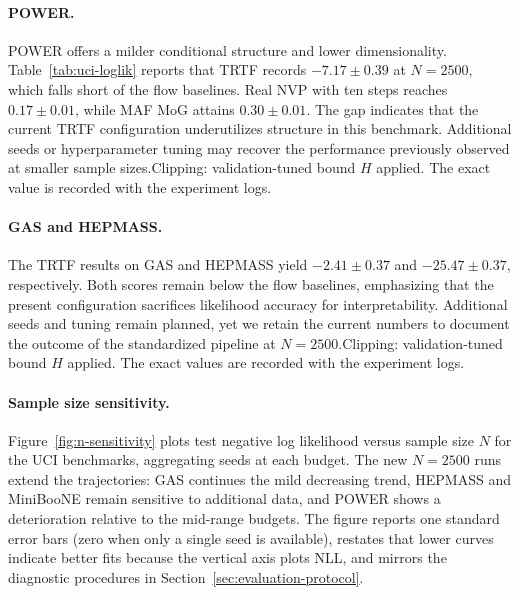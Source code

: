 \documentclass[11pt,a4paper,twoside]{book}\usepackage[]{graphicx}\usepackage[]{xcolor}
\begin{document}
\paragraph{POWER.} POWER offers a milder conditional structure and lower dimensionality. Table~\ref{tab:uci-loglik} reports that TRTF records $-7.17 \pm 0.39$ at $N=2500$, which falls short of the flow baselines. Real NVP with ten steps reaches $0.17 \pm 0.01$, while MAF MoG attains $0.30 \pm 0.01$. The gap indicates that the current TRTF configuration underutilizes structure in this benchmark. Additional seeds or hyperparameter tuning may recover the performance previously observed at smaller sample sizes.\;Clipping: validation-tuned bound $H$ applied. The exact value is recorded with the experiment logs.

\paragraph{GAS and HEPMASS.} The TRTF results on GAS and HEPMASS yield $-2.41 \pm 0.37$ and $-25.47 \pm 0.37$, respectively. Both scores remain below the flow baselines, emphasizing that the present configuration sacrifices likelihood accuracy for interpretability. Additional seeds and tuning remain planned, yet we retain the current numbers to document the outcome of the standardized pipeline at $N=2500$.\;Clipping: validation-tuned bound $H$ applied. The exact values are recorded with the experiment logs.

\paragraph{Sample size sensitivity.} Figure~\ref{fig:n-sensitivity} plots test negative log likelihood versus sample size $N$ for the UCI benchmarks, aggregating seeds at each budget. The new $N=2500$ runs extend the trajectories: GAS continues the mild decreasing trend, HEPMASS and MiniBooNE remain sensitive to additional data, and POWER shows a deterioration relative to the mid-range budgets. The figure reports one standard error bars (zero when only a single seed is available), restates that lower curves indicate better fits because the vertical axis plots NLL, and mirrors the diagnostic procedures in Section~\ref{sec:evaluation-protocol}.
\end{document}
